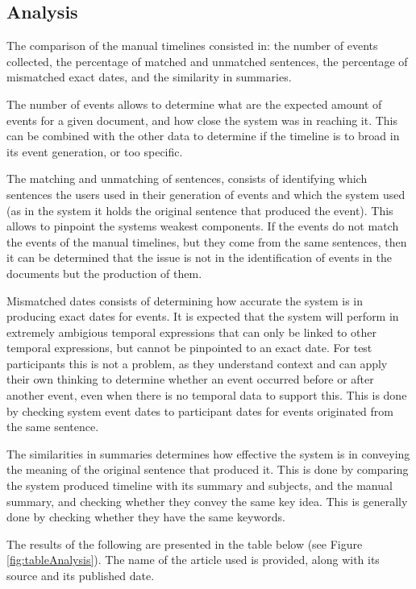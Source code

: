 \subsection{Analysis}
\par The comparison of the manual timelines consisted in: the number of events collected, the percentage of matched and unmatched sentences, the percentage of mismatched exact dates, and the similarity in summaries. 
\par The number of events allows to determine what are the expected amount of events for a given document, and how close the system was in reaching it. This can be combined with the other data to determine if the timeline is to broad in its event generation, or too specific.
\par The matching and unmatching of sentences, consists of identifying which sentences the users used in their generation of events and which the system used (as in the system it holds the original sentence that produced the event). This allows to pinpoint the systems weakest components. If the events do not match the events of the manual timelines, but they come from the same sentences, then it can be determined that the issue is not in the identification of events in the documents but the production of them.
\par Mismatched dates consists of determining how accurate the system is in producing exact dates for events. It is expected that the system will perform in extremely ambigious temporal expressions that can only be linked to other temporal expressions, but cannot be pinpointed to an exact date. For test participants this is not a problem, as they understand context and can apply their own thinking to determine whether an event occurred before or after another event, even when there is no temporal data to support this. This is done by checking system event dates to participant dates for events originated from the same sentence.
\par The similarities in summaries determines how effective the system is in conveying the meaning of the original sentence that produced it. This is done by comparing the system produced timeline with its summary and subjects, and the manual summary, and checking whether they convey the same key idea. This is generally done by checking whether they have the same keywords.
\par The results of the following are presented in the table below (see Figure \ref{fig:tableAnalysis}). The name of the article used is provided, along with its source and its published date.
